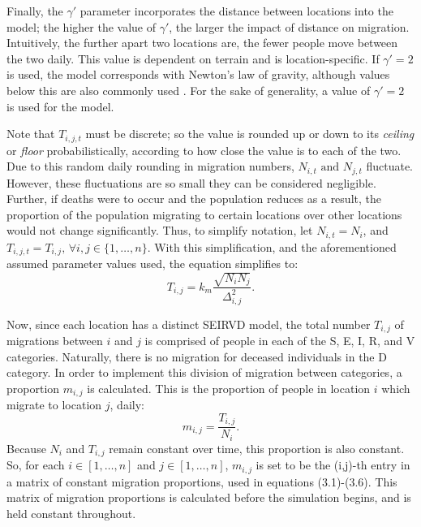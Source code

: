 Finally, the $\gamma'$ parameter incorporates the distance between locations into the model; the higher the value of $\gamma'$, the larger the impact of distance on migration. Intuitively, the further apart two locations are, the fewer people move between the two daily. This value is dependent on terrain and is location-specific. If $\gamma' = 2$ is used, the model corresponds with Newton's law of gravity, although values below this are also commonly used \cite{poot_alimi_cameron_maré_2016}. For the sake of generality, a value of $\gamma' = 2$ is used for the model. 

Note that $T_{i,j,t}$ must be discrete; so the value is rounded up or down to its \textit{ceiling} or \textit{floor} probabilistically, according to how close the value is to each of the two. Due to this random daily rounding in migration numbers, $N_{i,t} \text{ and } N_{j,t}$ fluctuate. However, these fluctuations are so small they can be considered negligible. Further, if deaths were to occur and the population reduces as a result, the proportion of the population migrating to certain locations over other locations would not change significantly. Thus, to simplify notation, let $N_{i,t} = N_{i}$, and $T_{i,j,t} = T_{i,j}, \, \forall{i,j} \in \{1,\dots,n\}$. With this simplification, and the aforementioned assumed parameter values used, the equation simplifies to:
$$T_{i,j} = k_{m} \frac{\sqrt{N_{i} N_{j}}}{\Delta_{i,j}^{2}}.$$

Now, since each location has a distinct SEIRVD model, the total number $T_{i,j}$ of migrations between $i$ and $j$ is comprised of people in each of the S, E, I, R, and V categories. Naturally, there is no migration for deceased individuals in the D category. In order to implement this division of migration between categories, a proportion $m_{i,j}$ is calculated. This is the proportion of people in location $i$ which migrate to location $j$, daily: $$m_{i,j} = \frac{T_{i,j}}{N_{i}}.$$ Because $N_{i}$ and $T_{i,j}$ remain constant over time, this proportion is also constant. So, for each $i \in [1,\dots,n]$ and $j \in [1,\dots,n]$, $m_{i,j}$ is set to be the (i,j)-th entry in a matrix of constant migration proportions, used in equations (3.1)-(3.6). This matrix of migration proportions is calculated before the simulation begins, and is held constant throughout.

